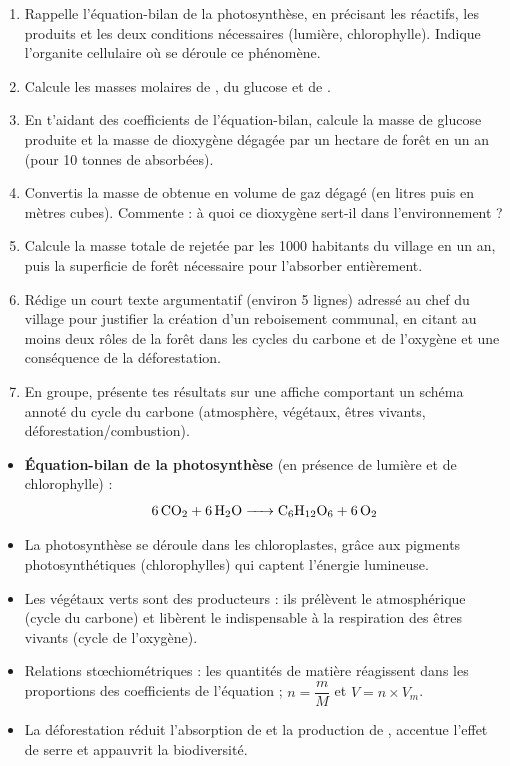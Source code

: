 \documentclass[11pt]{article}
\newcommand{\cle}[1]{{\popxbold\color{popdark}#1}}
\newcounter{popsec}
\newcounter{popsub}
\newcommand{\courssub}[1]{%
  \stepcounter{popsub}%
  \par\vspace{9pt}\noindent{\popxbold\fontsize{11.5}{13}\selectfont\color{popink}{\color{poporange}\thepopsec.\thepopsub}\hspace{6pt}#1}\par\nopagebreak\vspace{4pt}
}
\begin{document}
\begin{enumerate}
\item Rappelle l'\cle{équation-bilan} de la photosynthèse, en précisant les réactifs, les produits et les deux conditions nécessaires (lumière, chlorophylle). Indique l'organite cellulaire où se déroule ce phénomène.
\item Calcule les masses molaires de , du glucose  et de .
\item En t'aidant des coefficients de l'équation-bilan, calcule la masse de glucose produite et la masse de dioxygène dégagée par un hectare de forêt en un an (pour 10 tonnes de  absorbées).
\item Convertis la masse de  obtenue en volume de gaz dégagé (en litres puis en mètres cubes). Commente : à quoi ce dioxygène sert-il dans l'environnement ?
\item Calcule la masse totale de  rejetée par les \num{1000} habitants du village en un an, puis la superficie de forêt nécessaire pour l'absorber entièrement.
\item Rédige un court texte argumentatif (environ 5 lignes) adressé au chef du village pour justifier la création d'un reboisement communal, en citant au moins deux rôles de la forêt dans les cycles du carbone et de l'oxygène et une conséquence de la déforestation.
\item En groupe, présente tes résultats sur une affiche comportant un schéma annoté du \cle{cycle du carbone} (atmosphère, végétaux, êtres vivants, déforestation/combustion).
\end{enumerate}

\courssub{Ressources à mobiliser}

\begin{aretenir}
\begin{itemize}
\item \textbf{Équation-bilan de la photosynthèse} (en présence de lumière et de chlorophylle) :
\[ \ce{6CO2 + 6H2O -> C6H12O6 + 6O2} \]
\item La photosynthèse se déroule dans les \cle{chloroplastes}, grâce aux \cle{pigments photosynthétiques} (chlorophylles) qui captent l'énergie lumineuse.
\item Les végétaux verts sont des \cle{producteurs} : ils prélèvent le  atmosphérique (cycle du carbone) et libèrent le  indispensable à la respiration des êtres vivants (cycle de l'oxygène).
\item Relations stœchiométriques : les quantités de matière réagissent dans les proportions des coefficients de l'équation ; $n = \dfrac{m}{M}$ et $V = n \times V_m$.
\item La déforestation réduit l'absorption de  et la production de , accentue l'effet de serre et appauvrit la biodiversité.
\end{itemize}
\end{aretenir}
\end{document}
